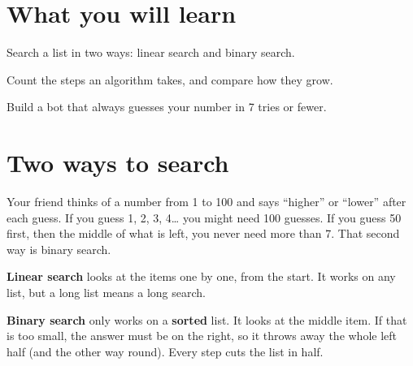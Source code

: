 
\section{What you will learn}
\begin{checklist}
  \item Search a list in two ways: linear search and binary search.
  \item Count the steps an algorithm takes, and compare how they grow.
  \item Build a bot that always guesses your number in 7 tries or fewer.
\end{checklist}

\section{Two ways to search}
\begin{analogy}
Your friend thinks of a number from 1 to 100 and says \enquote{higher} or \enquote{lower} after each guess. If you guess 1, 2, 3, 4\ldots{} you might need 100 guesses. If you guess 50 first, then the middle of what is left, you never need more than 7. That second way is binary search.
\end{analogy}

\textbf{Linear search} looks at the items one by one, from the start. It works on any list, but a long list means a long search.

\textbf{Binary search} only works on a \textbf{sorted} list. It looks at the middle item. If that is too small, the answer must be on the right, so it throws away the whole left half (and the other way round). Every step cuts the list in half.

